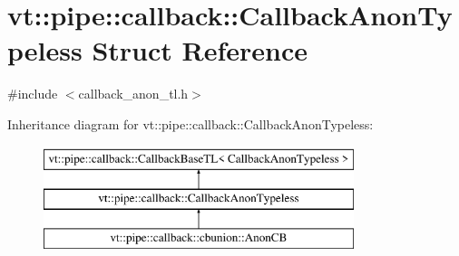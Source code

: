 \hypertarget{structvt_1_1pipe_1_1callback_1_1_callback_anon_typeless}{}\section{vt\+:\+:pipe\+:\+:callback\+:\+:Callback\+Anon\+Typeless Struct Reference}
\label{structvt_1_1pipe_1_1callback_1_1_callback_anon_typeless}


{\ttfamily \#include $<$callback\+\_\+anon\+\_\+tl.\+h$>$}

Inheritance diagram for vt\+:\+:pipe\+:\+:callback\+:\+:Callback\+Anon\+Typeless\+:\begin{figure}[H]
\begin{center}
\leavevmode
\includegraphics[height=3.000000cm]{structvt_1_1pipe_1_1callback_1_1_callback_anon_typeless}
\end{center}
\end{figure}
